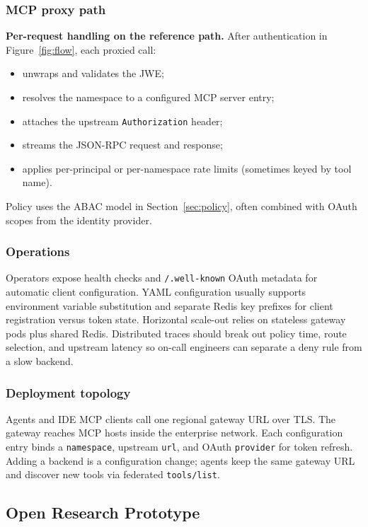 \documentclass[11pt]{article}
\newcommand{\code}[1]{\texttt{#1}}
\begin{document}
\subsubsection{MCP proxy path}

\textbf{Per-request handling on the reference path.}
After authentication in Figure~\ref{fig:flow}, each proxied call:
\begin{itemize}
  \item unwraps and validates the JWE;
  \item resolves the namespace to a configured MCP server entry;
  \item attaches the upstream \code{Authorization} header;
  \item streams the JSON-RPC request and response;
  \item applies per-principal or per-namespace rate limits (sometimes keyed by tool name).
\end{itemize}
Policy uses the ABAC model in Section~\ref{sec:policy}, often combined with OAuth scopes from the identity provider.

\subsubsection{Operations}

Operators expose health checks and \code{/.well-known} OAuth metadata for automatic client configuration.
YAML configuration usually supports environment variable substitution and separate Redis key prefixes for client registration versus token state.
Horizontal scale-out relies on stateless gateway pods plus shared Redis.
Distributed traces should break out policy time, route selection, and upstream latency so on-call engineers can separate a deny rule from a slow backend.

\subsubsection{Deployment topology}

Agents and IDE MCP clients call one regional gateway URL over TLS.
The gateway reaches MCP hosts inside the enterprise network.
Each configuration entry binds a \code{namespace}, upstream \code{url}, and OAuth \code{provider} for token refresh.
Adding a backend is a configuration change; agents keep the same gateway URL and discover new tools via federated \code{tools/list}.

\subsection{Open Research Prototype}
\label{sec:research-proto}
\end{document}
